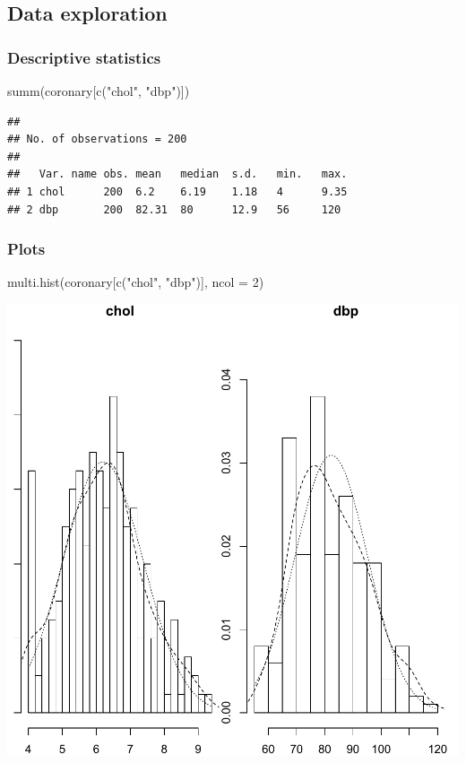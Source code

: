 \documentclass[
]{book}
\makeatletter
\newenvironment{Shaded}{\begin{snugshade}}{\end{snugshade}}
\newcommand{\AttributeTok}[1]{\textcolor[rgb]{0.61,0.61,0.61}{#1}}
\newcommand{\DecValTok}[1]{\textcolor[rgb]{0.06,0.06,0.06}{#1}}
\newcommand{\FunctionTok}[1]{\textcolor[rgb]{0,0,0}{#1}}
\newcommand{\NormalTok}[1]{#1}
\newcommand{\StringTok}[1]{\textcolor[rgb]{0.5,0.5,0.5}{#1}}
\newenvironment{kframe}{%
\medskip{}
\setlength{\fboxsep}{.8em}
 \def\at@end@of@kframe{}%
 \ifinner\ifhmode%
  \def\at@end@of@kframe{\end{minipage}}%
  \begin{minipage}{\columnwidth}%
 \fi\fi%
 \def\FrameCommand##1{\hskip\@totalleftmargin \hskip-\fboxsep
 \colorbox{shadecolor}{##1}\hskip-\fboxsep
     \hskip-\linewidth \hskip-\@totalleftmargin \hskip\columnwidth}%
 \MakeFramed {\advance\hsize-\width
   \@totalleftmargin\z@ \linewidth\hsize
   \@setminipage}}%
 {\par\unskip\endMakeFramed%
 \at@end@of@kframe}
\renewenvironment{Shaded}{\begin{kframe}}{\end{kframe}}
\makeatother
\begin{document}
\hypertarget{data-exploration}{%
\subsection{Data exploration}\label{data-exploration}}

\hypertarget{descriptive-statistics}{%
\subsubsection{Descriptive statistics}\label{descriptive-statistics}}

\begin{Shaded}
\begin{Highlighting}[]
\FunctionTok{summ}\NormalTok{(coronary[}\FunctionTok{c}\NormalTok{(}\StringTok{"chol"}\NormalTok{, }\StringTok{"dbp"}\NormalTok{)])}
\end{Highlighting}
\end{Shaded}

\begin{verbatim}
## 
## No. of observations = 200
## 
##   Var. name obs. mean   median  s.d.   min.   max.  
## 1 chol      200  6.2    6.19    1.18   4      9.35  
## 2 dbp       200  82.31  80      12.9   56     120
\end{verbatim}

\hypertarget{plots}{%
\subsubsection{Plots}\label{plots}}

\begin{Shaded}
\begin{Highlighting}[]
\FunctionTok{multi.hist}\NormalTok{(coronary[}\FunctionTok{c}\NormalTok{(}\StringTok{"chol"}\NormalTok{, }\StringTok{"dbp"}\NormalTok{)], }\AttributeTok{ncol =} \DecValTok{2}\NormalTok{)}
\end{Highlighting}
\end{Shaded}

\begin{center}\includegraphics[width=0.7\linewidth,keepaspectratio]{Multivariable_Data_Analysis_files/figure-latex/unnamed-chunk-102-1} \end{center}
\end{document}
